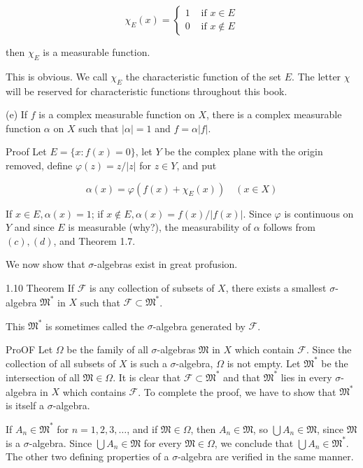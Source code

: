 \documentclass[10pt]{article}
\begin{document}
$$
\chi_{E}(x)= \begin{cases}1 & \text { if } x \in E \\ 0 & \text { if } x \notin E\end{cases}
$$

then $\chi_{E}$ is a measurable function.

This is obvious. We call $\chi_{E}$ the characteristic function of the set $E$. The letter $\chi$ will be reserved for characteristic functions throughout this book.

(e) If $f$ is a complex measurable function on $X$, there is a complex measurable function $\alpha$ on $X$ such that $|\alpha|=1$ and $f=\alpha|f|$.

Proof Let $E=\{x: f(x)=0\}$, let $Y$ be the complex plane with the origin removed, define $\varphi(z)=z /|z|$ for $z \in Y$, and put

$$
\alpha(x)=\varphi\left(f(x)+\chi_{E}(x)\right) \quad(x \in X)
$$

If $x \in E, \alpha(x)=1$; if $x \notin E, \alpha(x)=f(x) /|f(x)|$. Since $\varphi$ is continuous on $Y$ and since $E$ is measurable (why?), the measurability of $\alpha$ follows from $(c),(d)$, and Theorem 1.7.

We now show that $\sigma$-algebras exist in great profusion.

1.10 Theorem If $\mathscr{F}$ is any collection of subsets of $X$, there exists a smallest $\sigma$-algebra $\mathfrak{M}^{*}$ in $X$ such that $\mathscr{F} \subset \mathfrak{M}^{*}$.

This $\mathfrak{M}^{*}$ is sometimes called the $\sigma$-algebra generated by $\mathscr{F}$.

ProOF Let $\Omega$ be the family of all $\sigma$-algebras $\mathfrak{M}$ in $X$ which contain $\mathscr{F}$. Since the collection of all subsets of $X$ is such a $\sigma$-algebra, $\Omega$ is not empty. Let $\mathfrak{M}^{*}$ be the intersection of all $\mathfrak{M} \in \Omega$. It is clear that $\mathscr{F} \subset \mathfrak{M}^{*}$ and that $\mathfrak{M}^{*}$ lies in every $\sigma$-algebra in $X$ which contains $\mathscr{F}$. To complete the proof, we have to show that $\mathfrak{M}^{*}$ is itself a $\sigma$-algebra.

If $A_{n} \in \mathfrak{M}^{*}$ for $n=1,2,3, \ldots$, and if $\mathfrak{M} \in \Omega$, then $A_{n} \in \mathfrak{M}$, so $\bigcup A_{n} \in \mathfrak{M}$, since $\mathfrak{M}$ is a $\sigma$-algebra. Since $\bigcup A_{n} \in \mathfrak{M}$ for every $\mathfrak{M} \in \Omega$, we conclude that $\bigcup A_{n} \in \mathfrak{M}^{*}$. The other two defining properties of a $\sigma$-algebra are verified in the same manner.
\end{document}
